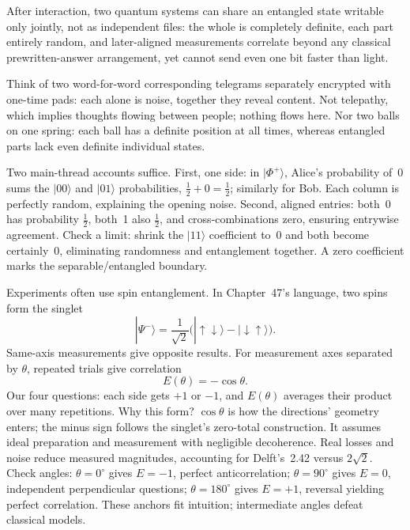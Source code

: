 
\begin{oneline}
After interaction, two quantum systems can share an entangled state writable only jointly, not as independent files: the whole is completely definite, each part entirely random, and later-aligned measurements correlate beyond any classical prewritten-answer arrangement, yet cannot send even one bit faster than light.
\end{oneline}

Think of two word-for-word corresponding telegrams separately encrypted with one-time pads: each alone is noise, together they reveal content. Not telepathy, which implies thoughts flowing between people; nothing flows here. Nor two balls on one spring: each ball has a definite position at all times, whereas entangled parts lack even definite individual states.


Two main-thread accounts suffice. First, one side: in \(|\Phi^{+}\rangle\), Alice's probability of~0 sums the \(|00\rangle\) and \(|01\rangle\) probabilities, \(\tfrac12+0=\tfrac12\); similarly for Bob. Each column is perfectly random, explaining the opening noise. Second, aligned entries: both~0 has probability \(\tfrac12\), both~1 also \(\tfrac12\), and cross-combinations zero, ensuring entrywise agreement. Check a limit: shrink the \(|11\rangle\) coefficient to~0 and both become certainly~0, eliminating randomness and entanglement together. A zero coefficient marks the separable/entangled boundary.

Experiments often use spin entanglement. In Chapter~47's language, two spins form the singlet
\[
|\Psi^{-}\rangle=\frac{1}{\sqrt2}\big(|{\uparrow\downarrow}\rangle-|{\downarrow\uparrow}\rangle\big).
\]
Same-axis measurements give opposite results. For measurement axes separated by \(\theta\), repeated trials give correlation
\[
E(\theta)=-\cos\theta .
\]
Our four questions: each side gets \(+1\) or \(-1\), and \(E(\theta)\) averages their product over many repetitions. Why this form? \(\cos\theta\) is how the directions' geometry enters; the minus sign follows the singlet's zero-total construction. It assumes ideal preparation and measurement with negligible decoherence. Real losses and noise reduce measured magnitudes, accounting for Delft's~2.42 versus \(2\sqrt2\). Check angles: \(\theta=0^\circ\) gives \(E=-1\), perfect anticorrelation; \(\theta=90^\circ\) gives \(E=0\), independent perpendicular questions; \(\theta=180^\circ\) gives \(E=+1\), reversal yielding perfect correlation. These anchors fit intuition; intermediate angles defeat classical models.

